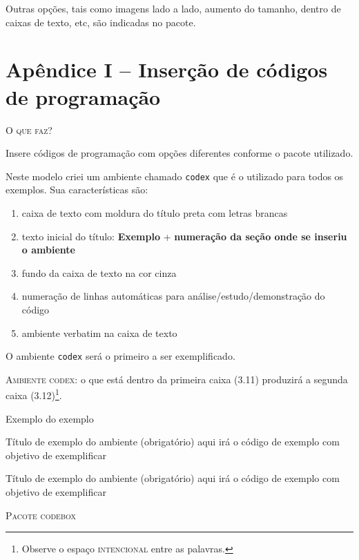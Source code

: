 Outras opções, tais como imagens lado a lado, aumento do tamanho, dentro de caixas de texto, etc, são indicadas no pacote.


\chapter*{Apêndice I -- Inserção de códigos de programação}

\noindent\textsc{O que faz?}

Insere códigos de programação com opções diferentes conforme o pacote utilizado. 

Neste modelo criei um ambiente chamado \verb|codex| que é o utilizado para todos os exemplos. Sua características são:

\begin{enumerate}
    \item caixa de texto com moldura do título preta com letras brancas
    \item texto inicial do título: \textbf{Exemplo} + \textbf{numeração da seção onde se inseriu o ambiente}
    \item fundo da caixa de texto na cor cinza
    \item numeração de linhas automáticas para análise/estudo/demonstração do código
    \item ambiente verbatim na caixa de texto
\end{enumerate} 

O ambiente \verb|codex| será o primeiro a ser exemplificado.

\textsc{Ambiente codex:} o que está dentro da primeira caixa (3.11) produzirá a segunda caixa (3.12)\footnote{Observe o espaço \textsc{intencional} entre as palavras.}.

\begin{codex}{Exemplo do exemplo}
\begin{codex}{Título de exemplo do ambiente (obrigatório)}
    aqui irá o código
        de      exemplo
    com     objetivo    de      exemplificar
\end{codex}
\end{codex}

\begin{codex}{Título de exemplo do ambiente (obrigatório)}
    aqui irá o código
        de      exemplo
    com     objetivo    de      exemplificar
\end{codex}

\newpage
\textsc{Pacote codebox}

